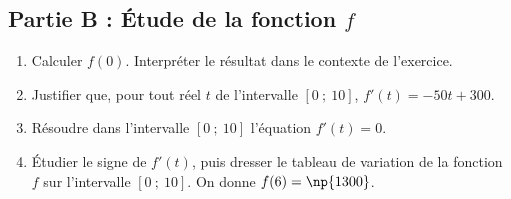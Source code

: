 \subsection*{Partie B : Étude de la fonction $f$}

\begin{enumerate}
	\item Calculer $f(0)$. Interpréter le résultat dans le contexte de l'exercice.
	\item Justifier que, pour tout réel $t$ de l'intervalle $[0~;~10]$, $f'(t) = -50t + 300$.
	\item Résoudre dans l'intervalle $[0~;~10]$ l'équation $f'(t)=0$.
	\item Étudier le signe de $f'(t)$, puis dresser le tableau de variation de la fonction $f$ sur l'intervalle $[0~;~10]$. On donne $f(6)=\np{1300}$.
\end{enumerate}

